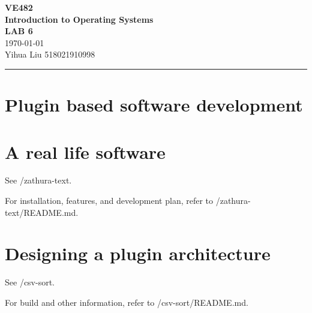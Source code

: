 \documentclass[a4paper]{article}
\begin{document}
\begin{center}
    \huge
    \textbf{VE482\\Introduction to Operating Systems\\}
    \Large
    \vspace{15pt}
    \uppercase{\textbf{Lab 6}}\\
    \large
    \vspace{5pt}\today\\
    \vspace{5pt}
    Yihua Liu 518021910998
    \vspace{5pt}
    \rule[-5pt]{.97\linewidth}{0.05em}
\end{center}
\section{Plugin based software development}
\section{A real life software}
See /zathura-text.

For installation, features, and development plan, refer to /zathura-text/README.md.
\section{Designing a plugin architecture}
See /csv-sort.

For build and other information, refer to /csv-sort/README.md.
\end{document}
